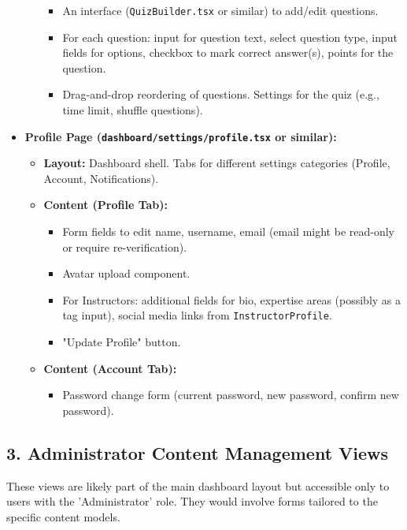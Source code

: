 \begin{itemize}
\begin{itemize}
\begin{itemize}
            \item An interface (\texttt{QuizBuilder.tsx} or similar) to add/edit questions.
            \item For each question: input for question text, select question type, input fields for options, checkbox to mark correct answer(s), points for the question.
            \item Drag-and-drop reordering of questions. Settings for the quiz (e.g., time limit, shuffle questions).
        \end{itemize}
    \end{itemize}
    \item \textbf{Profile Page (\texttt{dashboard/settings/profile.tsx} or similar):}
    \begin{itemize}
        \item \textbf{Layout:} Dashboard shell. Tabs for different settings categories (Profile, Account, Notifications).
        \item \textbf{Content (Profile Tab):}
        \begin{itemize}
            \item Form fields to edit name, username, email (email might be read-only or require re-verification).
            \item Avatar upload component.
            \item For Instructors: additional fields for bio, expertise areas (possibly as a tag input), social media links from \texttt{InstructorProfile}.
            \item "Update Profile" button.
        \end{itemize}
        \item \textbf{Content (Account Tab):}
        \begin{itemize}
            \item Password change form (current password, new password, confirm new password).
        \end{itemize}
    \end{itemize}
\end{itemize}

\subsection*{3. Administrator Content Management Views}

These views are likely part of the main dashboard layout but accessible only to users with the 'Administrator' role. They would involve forms tailored to the specific content models.

